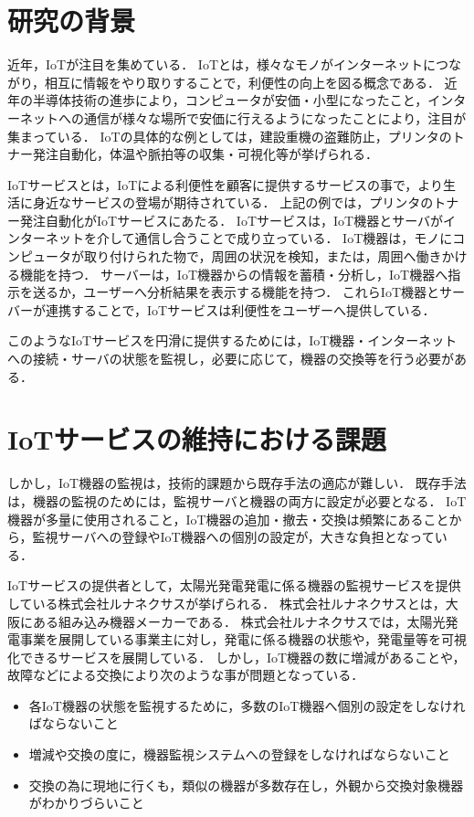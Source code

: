 \section{研究の背景}
近年，IoTが注目を集めている．
IoTとは，様々なモノがインターネットにつながり，相互に情報をやり取りすることで，利便性の向上を図る概念である．
近年の半導体技術の進歩により，コンピュータが安価・小型になったこと，インターネットへの通信が様々な場所で安価に行えるようになったことにより，注目が集まっている．
IoTの具体的な例としては，建設重機の盗難防止，プリンタのトナー発注自動化，体温や脈拍等の収集・可視化等が挙げられる．
\medskip

IoTサービスとは，IoTによる利便性を顧客に提供するサービスの事で，より生活に身近なサービスの登場が期待されている．
上記の例では，プリンタのトナー発注自動化がIoTサービスにあたる．
IoTサービスは，IoT機器とサーバがインターネットを介して通信し合うことで成り立っている．
IoT機器は，モノにコンピュータが取り付けられた物で，周囲の状況を検知，または，周囲へ働きかける機能を持つ．
サーバーは，IoT機器からの情報を蓄積・分析し，IoT機器へ指示を送るか，ユーザーへ分析結果を表示する機能を持つ．
これらIoT機器とサーバーが連携することで，IoTサービスは利便性をユーザーへ提供している．
\medskip

このようなIoTサービスを円滑に提供するためには，IoT機器・インターネットへの接続・サーバの状態を監視し，必要に応じて，機器の交換等を行う必要がある．

\section{IoTサービスの維持における課題}
しかし，IoT機器の監視は，技術的課題から既存手法の適応が難しい．
既存手法は，機器の監視のためには，監視サーバと機器の両方に設定が必要となる．
IoT機器が多量に使用されること，IoT機器の追加・撤去・交換は頻繁にあることから，監視サーバへの登録やIoT機器への個別の設定が，大きな負担となっている．
\medskip

IoTサービスの提供者として，太陽光発電発電に係る機器の監視サービスを提供している株式会社ルナネクサスが挙げられる．
株式会社ルナネクサスとは，大阪にある組み込み機器メーカーである．
株式会社ルナネクサスでは，太陽光発電事業を展開している事業主に対し，発電に係る機器の状態や，発電量等を可視化できるサービスを展開している．
しかし，IoT機器の数に増減があることや，故障などによる交換により次のような事が問題となっている．
\begin{itemize}
\item 各IoT機器の状態を監視するために，多数のIoT機器へ個別の設定をしなければならないこと
\item 増減や交換の度に，機器監視システムへの登録をしなければならないこと
\item 交換の為に現地に行くも，類似の機器が多数存在し，外観から交換対象機器がわかりづらいこと
\end{itemize}


